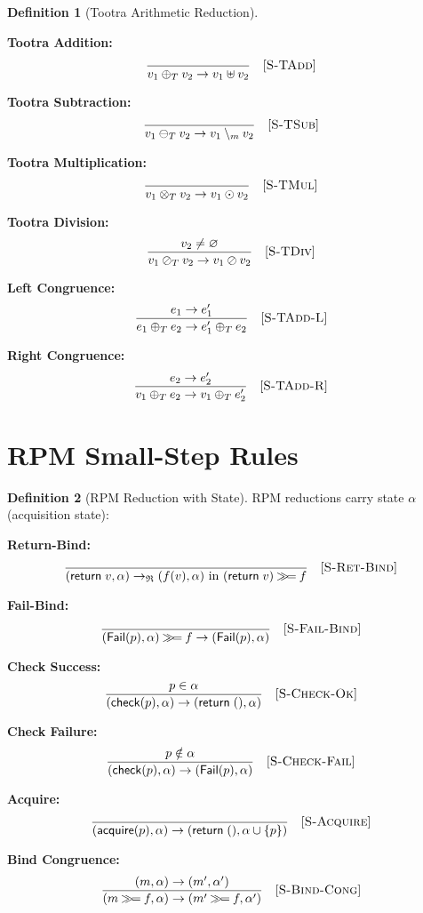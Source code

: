 \documentclass[11pt,twoside,openright]{book}
\theoremstyle{definition}
\newtheorem{definition}{Definition}[chapter]
\theoremstyle{plain}
\theoremstyle{remark}
\newcommand{\Tadd}{\oplus_T}
\newcommand{\Tsub}{\ominus_T}
\newcommand{\Tmul}{\otimes_T}
\newcommand{\Tdiv}{\oslash_T}
\newcommand{\RPM}{\mathfrak{R}}
\newcommand{\rpmret}{\mathsf{return}}
\newcommand{\rpmbind}{\mathbin{\gg\!=}}
\newcommand{\smallstep}{\to}
\newcommand{\Failed}{\mathsf{Fail}}
\begin{document}
\begin{definition}[Tootra Arithmetic Reduction]
\label{def:tootra-smallstep}

\textbf{Tootra Addition:}
\[
\frac{}
{v_1 \Tadd v_2 \smallstep v_1 \uplus v_2} \quad [\textsc{S-TAdd}]
\]

\textbf{Tootra Subtraction:}
\[
\frac{}
{v_1 \Tsub v_2 \smallstep v_1 \setminus_m v_2} \quad [\textsc{S-TSub}]
\]

\textbf{Tootra Multiplication:}
\[
\frac{}
{v_1 \Tmul v_2 \smallstep v_1 \odot v_2} \quad [\textsc{S-TMul}]
\]

\textbf{Tootra Division:}
\[
\frac{v_2 \neq \varnothing}
{v_1 \Tdiv v_2 \smallstep v_1 \oslash v_2} \quad [\textsc{S-TDiv}]
\]

\textbf{Left Congruence:}
\[
\frac{e_1 \smallstep e_1'}
{e_1 \Tadd e_2 \smallstep e_1' \Tadd e_2} \quad [\textsc{S-TAdd-L}]
\]

\textbf{Right Congruence:}
\[
\frac{e_2 \smallstep e_2'}
{v_1 \Tadd e_2 \smallstep v_1 \Tadd e_2'} \quad [\textsc{S-TAdd-R}]
\]
\end{definition}

\section{RPM Small-Step Rules}

\begin{definition}[RPM Reduction with State]
\label{def:rpm-smallstep}
RPM reductions carry state $\alpha$ (acquisition state):

\textbf{Return-Bind:}
\[
\frac{}
{(\rpmret\; v, \alpha) \smallstep_\RPM (f(v), \alpha) \text{ in } (\rpmret\; v) \rpmbind f} \quad [\textsc{S-Ret-Bind}]
\]

\textbf{Fail-Bind:}
\[
\frac{}
{(\Failed(p), \alpha) \rpmbind f \smallstep (\Failed(p), \alpha)} \quad [\textsc{S-Fail-Bind}]
\]

\textbf{Check Success:}
\[
\frac{p \in \alpha}
{(\mathsf{check}(p), \alpha) \smallstep (\rpmret\; (), \alpha)} \quad [\textsc{S-Check-Ok}]
\]

\textbf{Check Failure:}
\[
\frac{p \notin \alpha}
{(\mathsf{check}(p), \alpha) \smallstep (\Failed(p), \alpha)} \quad [\textsc{S-Check-Fail}]
\]

\textbf{Acquire:}
\[
\frac{}
{(\mathsf{acquire}(p), \alpha) \smallstep (\rpmret\; (), \alpha \cup \{p\})} \quad [\textsc{S-Acquire}]
\]

\textbf{Bind Congruence:}
\[
\frac{(m, \alpha) \smallstep (m', \alpha')}
{(m \rpmbind f, \alpha) \smallstep (m' \rpmbind f, \alpha')} \quad [\textsc{S-Bind-Cong}]
\]
\end{definition}
\end{document}

